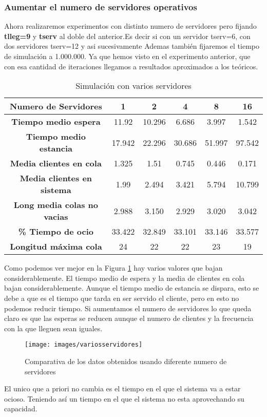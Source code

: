 \documentclass[12pt,a4paper]{article}
\begin{document}
\subsubsection{Aumentar el numero de servidores operativos}
Ahora realizaremos experimentos con distinto numero de servidores pero fijando \textbf{tlleg=9} y \textbf{tserv}   al doble del anterior.Es decir si con un servidor tserv=6, con dos servidores tserv=12 y asi sucesivamente Ademas también fijaremos el tiempo de simulación a 1.000.000. Ya que hemos visto en el  experimento anterior, que con esa cantidad de iteraciones llegamos a resultados aproximados a los teóricos. 
 \begin{table}[H]
	\centering	
	\begin{tabular}{c|ccccc} \toprule
		Numero de Servidores&1 & 2 & 4 & 8 & 16 \\ \midrule
		\textbf{Tiempo medio espera}   		& 11.92  & 10.296 &  6.686 & 3.997 & 1.542 \\
		\textbf{Tiempo medio estancia} 		& 17.942  & 22.296 & 30.686 &  51.997 & 97.542 \\
		\textbf{Media clientes en cola}		& 1.325 & 1.51 & 0.745 & 0.446 & 0.171 \\		\midrule
		\textbf{Media clientes en sistema} 	& 1.99 & 2.494 & 3.421 & 5.794 & 10.799 \\
		\textbf{Long media colas no vacias} & 2.988 & 3.150 & 2.929 & 3.020& 3.042 \\
		\textbf{\% Tiempo de ocio}  		& 33.422 & 32.849 & 33.101 & 33.146  & 33.577 \\		
		\textbf{Longitud máxima cola}  		& 24 & 22 & 22 & 23  & 19 \\
		\midrule		
	\end{tabular}
	\caption{Simulación con varios servidores} \label{tab:colmmk1}
\end{table}
Como podemos ver mejor en la Figura \ref{fig:variosservidores} hay varios valores que bajan considerablemente. El tiempo medio de espera y la media de clientes en cola bajan considerablemente. Aunque el tiempo medio de estancia se dispara, esto se debe a que es el tiempo que tarda en ser servido el cliente, pero en esto no podemos reducir tiempo. Si aumentamos el numero de servidores lo que queda claro es que las esperas se reducen aunque el numero de clientes y la frecuencia con la que lleguen sean iguales.
\begin{figure}[ph]
	\centering
	\texttt{[image: images/variosservidores]}
	\caption{Comparativa de los datos obtenidos usando diferente numero de servidores}
	\label{fig:variosservidores}
\end{figure}
El unico que a priori no cambia es el tiempo en el que el sistema va a estar ocioso. Teniendo así un tiempo en el que el sistema no esta aprovechando su capacidad.
\end{document}
